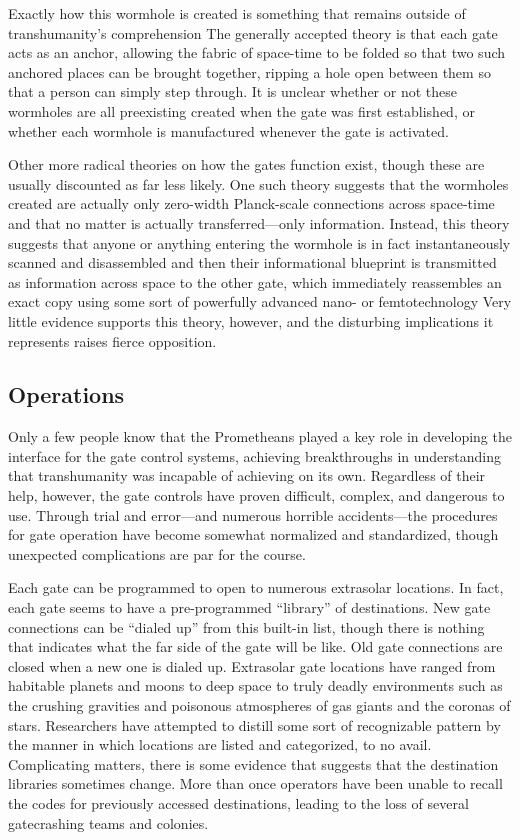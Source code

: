Exactly how this wormhole is created is something that remains outside of transhumanity's comprehension The generally accepted theory is that each gate acts as an anchor, allowing the fabric of space-time to be folded so that two such anchored places can be brought together, ripping a hole open between them so that a person can simply step through. It is unclear whether or not these wormholes are all preexisting created when the gate was first established, or whether each wormhole is manufactured whenever the gate is activated. 

Other more radical theories on how the gates function exist, though these are usually discounted as far less likely. One such theory suggests that the wormholes created are actually only zero-width Planck-scale connections across space-time and that no matter is actually transferred—only information. Instead, this theory suggests that anyone or anything entering the wormhole is in fact instantaneously scanned and disassembled and then their informational blueprint is transmitted as information across space to the other gate, which immediately reassembles an exact copy using some sort of powerfully advanced nano- or femtotechnology Very little evidence supports this theory, however, and the disturbing implications it represents raises fierce opposition. 

\subsection{Operations} 

Only a few people know that the Prometheans played a key role in developing the interface for the gate control systems, achieving breakthroughs in understanding that transhumanity was incapable of achieving on its own. Regardless of their help, however, the gate controls have proven difficult, complex, and dangerous to use. Through trial and error—and numerous horrible accidents—the procedures for gate operation have become somewhat normalized and standardized, though unexpected complications are par for the course. 

Each gate can be programmed to open to numerous extrasolar locations. In fact, each gate seems to have a pre-programmed ``library'' of destinations. New gate connections can be ``dialed up'' from this built-in list, though there is nothing that indicates what the far side of the gate will be like. Old gate connections are closed when a new one is dialed up. Extrasolar gate locations have ranged from habitable planets and moons to deep space to truly deadly environments such as the crushing gravities and poisonous atmospheres of gas giants and the coronas of stars. Researchers have attempted to distill some sort of recognizable pattern by the manner in which locations are listed and categorized, to no avail. Complicating matters, there is some evidence that suggests that the destination libraries sometimes change. More than once operators have been unable to recall the codes for previously accessed destinations, leading to the loss of several gatecrashing teams and colonies. 

